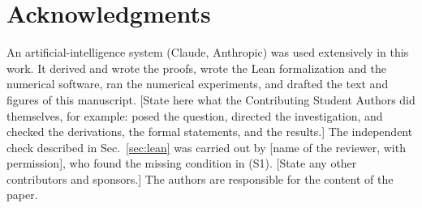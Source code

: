 \section*{Acknowledgments}
An artificial-intelligence system (Claude, Anthropic) was used extensively in this work. It derived and wrote the proofs,
wrote the Lean formalization and the numerical software, ran the numerical experiments, and drafted the text and figures of
this manuscript. [State here what the Contributing Student Authors did themselves, for example: posed the question, directed
the investigation, and checked the derivations, the formal statements, and the results.] The independent check described in
Sec.~\ref{sec:lean} was carried out by [name of the reviewer, with permission], who found the missing condition in (S1).
[State any other contributors and sponsors.] The authors are responsible for the content of the paper.

